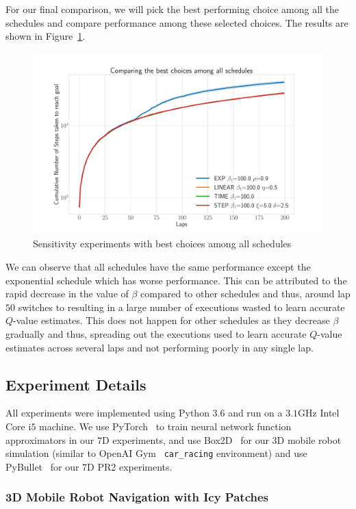For our final comparison, we will pick the best performing choice
among all the schedules and compare performance among these selected
choices. The results are shown in Figure~\ref{fig:best}.

\begin{figure}
  \centering
  \includegraphics[width=0.5\linewidth]{figures/cmaxpp/alpha_best.pdf}
  \caption{Sensitivity experiments with best choices among all
    schedules}
  \label{fig:best}
\end{figure}

We can observe that all schedules have the same performance except the
exponential schedule which has worse performance. This can be
attributed to the rapid decrease in the value of $\beta$ compared to
other schedules and thus, around lap $50$ \acmaxpp{} switches to
\cmaxpp{} resulting in a large number of executions wasted to learn
accurate $Q$-value estimates. This does not happen for other schedules
as they decrease $\beta$ gradually and thus, spreading out the
executions used to learn accurate $Q$-value estimates across several
laps and not performing poorly in any single lap.

\subsection{Experiment Details}
\label{sec:experiment-details}

All experiments were implemented using Python 3.6 and run on a
$3.1$GHz Intel Core i$5$ machine. We use
PyTorch~\cite{NEURIPS2019_9015} to train neural network function
approximators in our $7$D experiments, and use Box2D~\cite{catto2007box2d} for our 3D mobile
robot simulation (similar to OpenAI Gym~\cite{brockman2016openai}
\texttt{car\_racing} environment) and use
PyBullet~\cite{coumans2013bullet} for our $7$D PR2 experiments.

\subsubsection{3D Mobile Robot Navigation with Icy Patches}
\label{sec:3d-mobile-robot}

